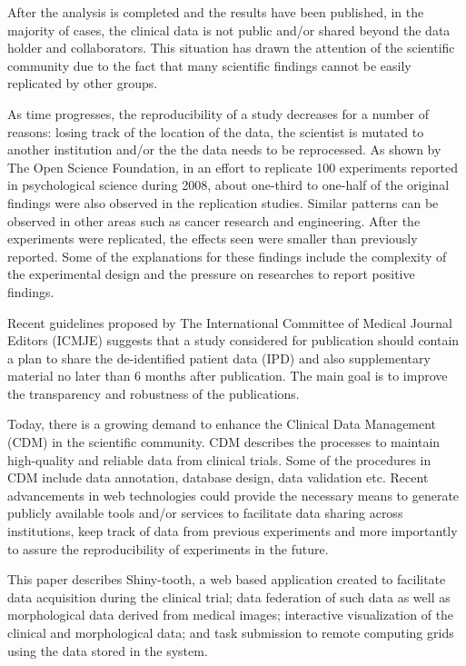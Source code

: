 \documentclass[]{spie}  %
\begin{document}
After the analysis is completed and the results have been published, in the majority of cases, 
the clinical data is not public and/or shared beyond the data holder and collaborators. 
This situation has drawn the attention of the scientific community due to the fact that many scientific findings cannot be easily replicated by other groups. 

As time progresses, the reproducibility of a study decreases for a number of reasons: losing track of the location of the data, the scientist is mutated to another institution and/or the the data needs to be reprocessed. As shown by The Open Science Foundation, in an effort to replicate 100 experiments reported in psychological science during 2008\cite{open2015estimating}, about one-third to one-half of the original findings were also observed in the replication studies. 
Similar patterns can be observed in other areas such as cancer research and engineering. 
After the experiments were replicated, the effects seen were smaller than previously reported. 
Some of the explanations for these findings include the complexity of the experimental design and the pressure on researches to report positive findings. 

Recent guidelines proposed by The International Committee of Medical Journal Editors (ICMJE) suggests that a study considered for publication should 
contain a plan to share the de-identified patient data (IPD) and also supplementary material no later than 6 months 
after publication\cite{doi:10.1001/jama.2015.18164}. The main goal is to improve the transparency and robustness of the publications. 

Today, there is a growing demand to enhance the Clinical Data Management (CDM) \cite{krishnankutty_data_2012} in the scientific community. 
CDM describes the processes to maintain high-quality and reliable data from clinical trials.  
Some of the procedures in CDM include data annotation, database design, data validation etc. 
Recent advancements in web technologies could provide the necessary means to generate publicly available tools and/or services to 
facilitate data sharing across institutions, keep track of data from previous experiments and more importantly to 
assure the reproducibility of experiments in the future.

This paper describes Shiny-tooth, a web based application created to facilitate data 
acquisition during the clinical trial; 
data federation of such data as well as morphological data derived from medical images; 
interactive visualization of the clinical and morphological data; and task submission 
to remote computing grids using the data stored in the system.
\end{document}
